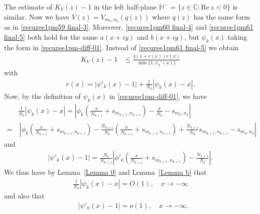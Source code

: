 \documentclass[12pt]{amsart}
\numberwithin{equation}{section}
\begin{document}
The estimate of $K_V(z)-1$ in the left half-plane $\mathbb{H}^-=\{z\in\mathbb{C}: \text{Re}\ z<0\}$ is similar. Now we have $V(z)=V_{m_k,n_k}(q(z))$ where $q(z)$ has the same form as in \eqref{recuree1pm59 final-3}. Moreover, \eqref{recuree1pm60 final-4} and \eqref{recuree1pm61 final-5} both hold for the same $a(x+iy)$ and $b(x+iy)$, but $\psi_k(x)$ taking the form in \eqref{recuree1pm-diff-01}. Instead of \eqref{recuree1pm61 final-5} we obtain
\begin{equation*}%
\begin{split}
K_V(z)-1 &\leq \frac{4(1+r(x))r(x)}{\min\{1,\psi_k'(x)\}}
\end{split}
\end{equation*}
with
\begin{equation}\label{recuree1pm95}
\begin{split}
r(x)=\left|\psi'_k(x)-1\right|+\frac{1}{N_k}\left|\psi_k(x)-x\right|.
\end{split}
\end{equation}
Now, by the definition of $\psi_k(x)$ in \eqref{recuree1pm-diff-01}, we have
\begin{equation*}%
\begin{split}
& \frac{1}{N_k}\left|\psi_k(x)-x\right|=\left|\phi_k\left(\frac{x}{N_{k+1}}+s_{m_{k+1},n_{k+1}}\right)-\frac{x}{N_{k}}-s_{m_{k},n_{k}}\right|\\
=&\
\left|\phi_k\left(\frac{x}{N_{k+1}}+s_{m_{k+1},n_{k+1}}\right)-\frac{N_{k+1}}{N_{k}}\left(\frac{x}{N_{k+1}}+s_{m_{k+1},n_{k+1}}\right)+\frac{N_{k+1}}{N_{k}}s_{m_{k+1},n_{k+1}}-s_{m_{k},n_{k}}\right|
\end{split}
\end{equation*}
and
\begin{equation*}%
\begin{split}
\left|\psi'_k(x)-1\right|=\frac{N_k}{N_{k+1}}\left|\phi'_k\left(\frac{x}{N_{k+1}}+s_{m_{k+1},n_{k+1}}\right)-\frac{N_{k+1}}{N_k}\right|.
\end{split}
\end{equation*}
We thus have by Lemma~\ref{Lemma 0} and Lemma~\ref{Lemma b} that
\begin{equation}\label{recuree1-main eqiqu-uy-1-pr-2}
\begin{split}
\frac{1}{N_k}\left|\psi_k(x)-x\right|=O(1), \quad x\to-\infty
\end{split}
\end{equation}
and also that
\begin{equation*}%
\begin{split}
&\left|\psi'_k(x)-1\right|=o(1), \quad x\to-\infty.
\end{split}
\end{equation*}
\end{document}
